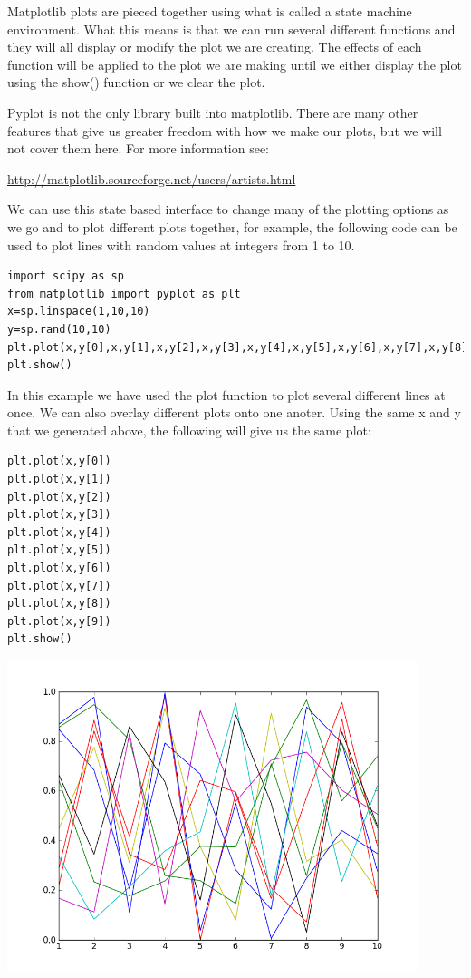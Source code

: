 Matplotlib plots are pieced together using what is called a state machine environment. What this means is that we can run several different functions and they will all display or modify the plot we are creating. The effects of each function will be applied to the plot we are making until we either display the plot using the show() function or we clear the plot.

Pyplot is not the only library built into matplotlib. There are many other features that give us greater freedom with how we make our plots, but we will not cover them here. For more information see: 

\url{http://matplotlib.sourceforge.net/users/artists.html}

We can use this state based interface to change many of the plotting options as we go and to plot different plots together, for example, the following code can be used to plot lines with random values at integers from 1 to 10.

\begin{lstlisting}
import scipy as sp
from matplotlib import pyplot as plt
x=sp.linspace(1,10,10)
y=sp.rand(10,10)
plt.plot(x,y[0],x,y[1],x,y[2],x,y[3],x,y[4],x,y[5],x,y[6],x,y[7],x,y[8],x,y[9])
plt.show()
\end{lstlisting}

In this example we have used the plot function to plot several different lines at once. We can also overlay different plots onto one anoter. Using the same x and y that we generated above, the following will give us the same plot:

\begin{lstlisting}
plt.plot(x,y[0])
plt.plot(x,y[1])
plt.plot(x,y[2])
plt.plot(x,y[3])
plt.plot(x,y[4])
plt.plot(x,y[5])
plt.plot(x,y[6])
plt.plot(x,y[7])
plt.plot(x,y[8])
plt.plot(x,y[9])
plt.show()
\end{lstlisting}

\includegraphics[width=120mm]{statemachineexample.png}

